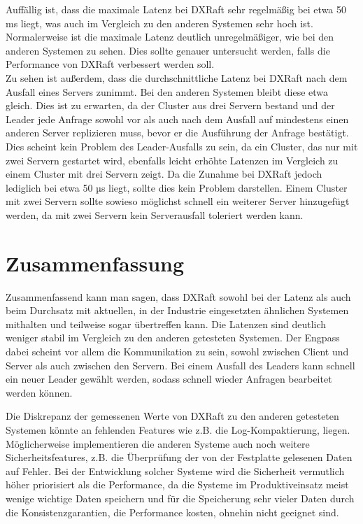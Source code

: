 Auffällig ist, dass die maximale Latenz bei DXRaft sehr regelmäßig bei etwa 50 ms liegt, was auch im Vergleich zu den anderen Systemen sehr hoch ist. Normalerweise ist die maximale Latenz deutlich unregelmäßiger, wie bei den anderen Systemen zu sehen. Dies sollte genauer untersucht werden, falls die Performance von DXRaft verbessert werden soll. \\
Zu sehen ist außerdem, dass die durchschnittliche Latenz bei DXRaft nach dem Ausfall eines Servers zunimmt. Bei den anderen Systemen bleibt diese etwa gleich. Dies ist zu erwarten, da der Cluster aus drei Servern bestand und der Leader jede Anfrage sowohl vor als auch nach dem Ausfall auf mindestens einen anderen Server replizieren muss, bevor er die Ausführung der Anfrage bestätigt. Dies scheint kein Problem des Leader-Ausfalls zu sein, da ein Cluster, das nur mit zwei Servern gestartet wird, ebenfalls leicht erhöhte Latenzen im Vergleich zu einem Cluster mit drei Servern zeigt. Da die Zunahme bei DXRaft jedoch lediglich bei etwa 50 µs liegt, sollte dies kein Problem darstellen. Einem Cluster mit zwei Servern sollte sowieso möglichst schnell ein weiterer Server hinzugefügt werden, da mit zwei Servern kein Serverausfall toleriert werden kann.


\section{Zusammenfassung}
\label{summary}

Zusammenfassend kann man sagen, dass DXRaft sowohl bei der Latenz als auch beim Durchsatz mit aktuellen, in der Industrie eingesetzten ähnlichen Systemen mithalten und teilweise sogar übertreffen kann. Die Latenzen sind deutlich weniger stabil im Vergleich zu den anderen getesteten Systemen. Der Engpass dabei scheint vor allem die Kommunikation zu sein, sowohl zwischen Client und Server als auch zwischen den Servern. Bei einem Ausfall des Leaders kann schnell ein neuer Leader gewählt werden, sodass schnell wieder Anfragen bearbeitet werden können. 

Die Diskrepanz der gemessenen Werte von DXRaft zu den anderen getesteten Systemen könnte an fehlenden Features wie z.B. die Log-Kompaktierung, liegen. Möglicherweise implementieren die anderen Systeme auch noch weitere Sicherheitsfeatures, z.B. die Überprüfung der von der Festplatte gelesenen Daten auf Fehler. Bei der Entwicklung solcher Systeme wird die Sicherheit vermutlich höher priorisiert als die Performance, da die Systeme im Produktiveinsatz meist wenige wichtige Daten speichern und für die Speicherung sehr vieler Daten durch die Konsistenzgarantien, die Performance kosten, ohnehin nicht geeignet sind.


